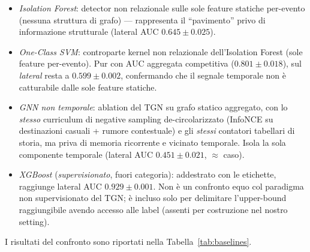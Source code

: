 \documentclass[11pt,a4paper]{report}
\begin{document}
\begin{itemize}
    \item \textit{Isolation Forest}: detector non relazionale sulle sole feature statiche per-evento (nessuna struttura di grafo) --- rappresenta il ``pavimento'' privo di informazione strutturale (lateral AUC $0.645\pm0.025$).
    \item \textit{One-Class SVM}: controparte kernel non relazionale dell'Isolation Forest (sole feature per-evento). Pur con AUC aggregata competitiva ($0.801\pm0.018$), sul \textit{lateral} resta a $0.599\pm0.002$, confermando che il segnale temporale non è catturabile dalle sole feature statiche.
    \item \textit{GNN non temporale}: ablation del TGN su grafo statico aggregato, con lo \emph{stesso} curriculum di negative sampling de-circolarizzato (InfoNCE su destinazioni casuali + rumore contestuale) e gli \emph{stessi} contatori tabellari di storia, ma priva di memoria ricorrente e vicinato temporale. Isola la sola componente temporale (lateral AUC $0.451\pm0.021$, $\approx$ caso).
    \item \textit{XGBoost} (\emph{supervisionato}, fuori categoria): addestrato con le etichette, raggiunge lateral AUC $0.929\pm0.001$. Non è un confronto equo col paradigma non supervisionato del TGN; è incluso solo per delimitare l'upper-bound raggiungibile avendo accesso alle label (assenti per costruzione nel nostro setting).
\end{itemize}

I risultati del confronto sono riportati nella Tabella~\ref{tab:baselines}.
\end{document}
